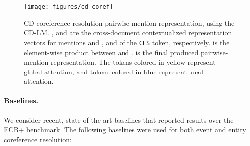 \documentclass[11pt,a4paper]{article}
\begin{document}
\begin{figure}[tb]
\centering
\texttt{[image: figures/cd-coref]}
\caption{CD-coreference resolution pairwise mention representation, using the CD-LM. ,  and  are the cross-document contextualized representation vectors for mentions  and , and of the {\tt CLS} token, respectively.  is the element-wise product between  and .  is the final produced pairwise-mention representation. The tokens colored in yellow represent global attention, and tokens colored in blue represent local attention.} 
\label{fig:cdcoref}
\end{figure}


\paragraph{Baselines.} We consider recent, state-of-the-art baselines that reported results over the ECB+ benchmark. The following baselines were used for both event and entity coreference resolution:





\setlength{\tabcolsep}{2.2pt}
\end{document}
